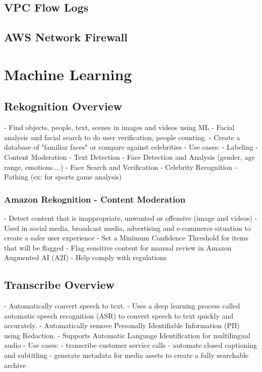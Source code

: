 \documentclass[11pt]{book}
\begin{document}
    \section{VPC Flow Logs}


    \section{AWS Network Firewall}


    \chapter{Machine Learning}


    \section{Rekognition Overview}
    - Find objects, people, text, scenes in images and videos using ML
    - Facial analysis and facial search to do user verification, people counting.
    - Create a database of "familiar faces" or compare against celebrities
    - Use cases:
    - Labeling
    - Content Moderation
    - Text Detection
    - Face Detection and Analysis (gender, age range, emotions....)
    - Face Search and Verification
    - Celebrity Recognition
    - Pathing (ex: for sports game analysis)

    \subsection{Amazon Rekognition - Content Moderation}
    - Detect content that is inappropriate, unwanted or offensive (image and videos)
    - Used in social media, broadcast media, advertising and e-commerce situation to create a safer user experience
    - Set a Minimum Confidence Threshold for items that will be flagged
    - Flag sensitive content for manual review in Amazon Augmented AI (A2I)
    - Help comply with regulations


    \section{Transcribe Overview}
    - Automatically convert speech to text.
    - Uses a deep learning process called automatic speech recognition (ASR) to convert speech to text quickly and accurately.
    - Automatically remove Personally Identifiable Information (PII) using Redaction.
    - Supports Automatic Language Identification for multilingual audio
    - Use cases:
    - transcribe customer service calls
    - automate closed captioning and subtitling
    - generate metadata for media assets to create a fully searchable archive
\end{document}
